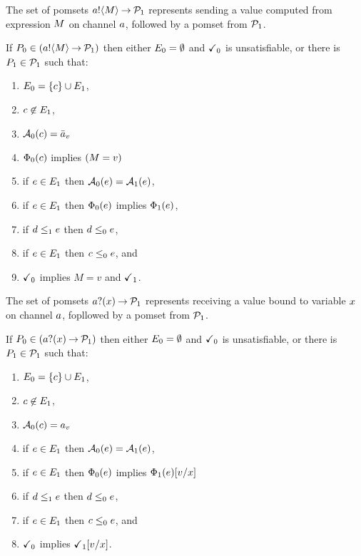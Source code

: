 The set of pomsets $\sSEND\aChan\aExp\sPREFIX\aPSS_1$ represents sending a value computed from expression $M$ on channel $a$,
followed by a pomset from $\mathcal{P}_1$.
\begin{definition}
  If $\aPS_0 \in (\sSEND\aChan\aExp\sPREFIX\aPSS_1)$ then either $E_0=\emptyset$ and $\checkmark_0$ is unsatisfiable, or there is $P_1\in\mathcal{P}_1$ such that:
  \begin{enumerate}
  \item $E_0 = \{c\} \cup E_1$,
  \item $c\not\in E_1$,
  \item $\mathcal{A}_0(c) = \bar{a}_{v}$
  \item $\Phi_0(c)$ implies $(M=v)$
  \item if $e\in E_1$ then $\mathcal{A}_0(e) = \mathcal{A}_1(e)$,
  \item if $e\in E_1$ then $\Phi_0(e)$ implies $\Phi_1(e)$,
  \item if $d\le_1e$ then $d\le_0e$,
  \item if $e\in E_1$ then $c\le_0e$, and
  \item $\checkmark_0$ implies $M=v$ and $\checkmark_1$.
  \end{enumerate}
\end{definition}

The set of pomsets $\sRECV\aChan\aVar\sPREFIX\aPSS_1$ represents receiving a value bound to variable $x$ on channel $a$,
fopllowed by a pomset from $\mathcal{P}_1$.
\begin{definition}
  If $\aPS_0 \in (\sRECV\aChan\aVar\sPREFIX\aPSS_1)$ then either $E_0=\emptyset$ and $\checkmark_0$ is unsatisfiable, or there is $P_1\in\mathcal{P}_1$ such that:
  \begin{enumerate}
  \item $E_0 = \{c\} \cup E_1$,
  \item $c\not\in E_1$,
  \item $\mathcal{A}_0(c) = {a}_{v}$
  \item if $e\in E_1$ then $\mathcal{A}_0(e) = \mathcal{A}_1(e)$,
  \item if $e\in E_1$ then $\Phi_0(e)$ implies $\Phi_1(e)[v/x]$
  \item if $d\le_1e$ then $d\le_0e$,
  \item if $e\in E_1$ then $c\le_0e$, and
  \item $\checkmark_0$ implies $\checkmark_1[v/x]$.
  \end{enumerate}
\end{definition}

